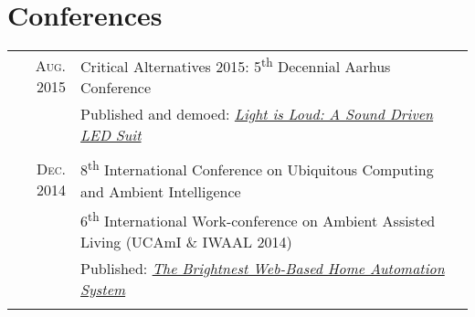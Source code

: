 \documentclass[letterpaper,10pt]{article}
\begin{document}

\section{Conferences}
\begin{tabular}{R|B}
	\textsc{Aug.} 2015 & Critical Alternatives 2015: 5\textsuperscript{th} Decennial Aarhus Conference                        \\
	                   & \small Published and demoed: \href{https://doi.org/10.7146/aahcc.v1i1.21320}
	{\emph{Light is Loud: A Sound Driven LED Suit}}                                                                           \\
	                                                                                                      \\

	\textsc{Dec.} 2014 & 8\textsuperscript{th} International Conference on Ubiquitous Computing and Ambient Intelligence      \\
	                   & 6\textsuperscript{th} International Work-conference on Ambient Assisted Living (UCAmI \& IWAAL 2014) \\
	                   & \small Published: \href{https://doi.org/10.1007/978-3-319-13102-3_14}
	{\emph{The Brightnest Web-Based Home Automation System}}                                                                  \\
	                                                                                                      \\
\end{tabular}
\end{document}
